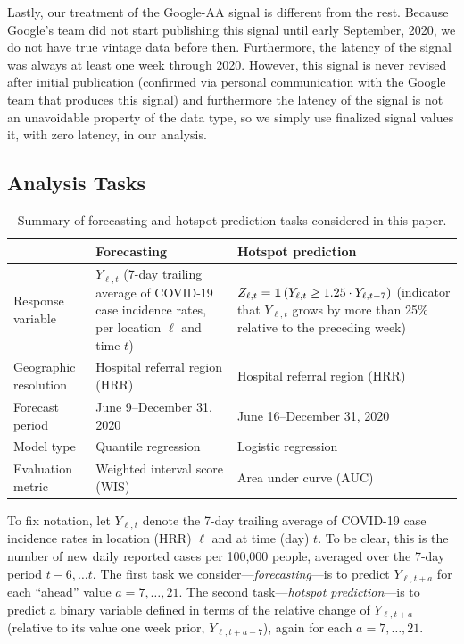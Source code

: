 \documentclass[9pt,twocolumn,twoside,lineno]{pnas-new}
\begin{document}
Lastly, our treatment of the Google-AA signal is different from the rest.
Because Google's team did not start publishing this signal until early
September, 2020, we do not have true vintage data before then.  Furthermore, the
latency of the signal was always at least one week through 2020.  However, this
signal is never revised after initial publication (confirmed via personal
communication with the Google team that produces this signal) and furthermore
the latency of the signal is not an unavoidable property of the data type, so we
simply use finalized signal values it, with zero latency, in our analysis.   

\subsection{Analysis Tasks}

\begin{table}[t]
\centering
\caption{Summary of forecasting and hotspot prediction tasks considered in
  this paper.}
\begin{tabular}{l p{2.75in} p{2.75in}}
  \toprule
  & \textbf{Forecasting} & \textbf{Hotspot prediction} \\
  \midrule
  Response variable & $Y_{\ell,t}$ (7-day trailing average of COVID-19 case 
incidence rates, per location $\ell$ and time $t$) & $Z_{\ell,t} =
\mathbf{1}\left(Y_{\ell,t} \geq 1.25 \cdot Y_{\ell,t-7}\right)$ (indicator that 
$Y_{\ell,t}$ grows by more than 25\% relative to the preceding week) \\ 
  Geographic resolution & Hospital referral region (HRR) & Hospital referral
region (HRR) \\ 
  Forecast period & June 9--December 31, 2020 & June 16--December 31, 2020 \\  
  Model type & Quantile regression & Logistic regression \\
  Evaluation metric & Weighted interval score (WIS) & Area under curve (AUC) \\
  \bottomrule
\end{tabular}
\label{tab:analysis_tasks}
\end{table}

To fix notation, let $Y_{\ell,t}$ denote the 7-day trailing average of COVID-19
case incidence rates in location (HRR) $\ell$ and at time (day) $t$.  To be
clear, this is the number of new daily reported cases per 100,000
people, averaged over the 7-day period $t-6, \ldots t$. The first task we
consider---\textit{forecasting}---is to predict $Y_{\ell,t+a}$ for each
``ahead'' value $a=7,\ldots,21$.  The second task---\textit{hotspot
  prediction}---is to predict a binary variable defined in terms of the relative
change of $Y_{\ell,t+a}$ (relative to its value one week prior,
$Y_{\ell,t+a-7}$), again for each $a=7,\ldots,21$.   
\end{document}
